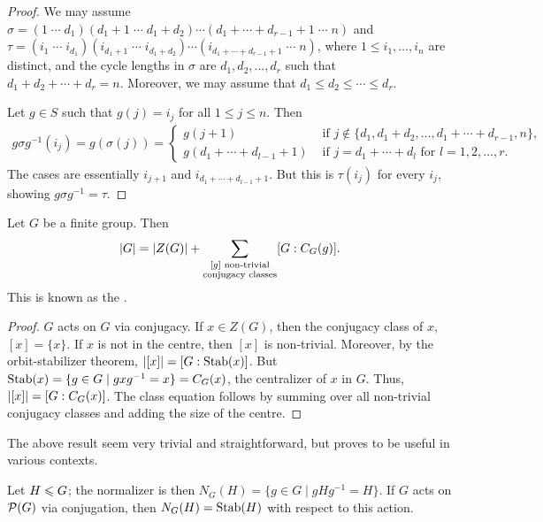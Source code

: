 \begin{proof}
    We may assume $\sigma = (1\;\cdots\;d_{1})(d_{1}+1\;\cdots\;d_{1}+d_{2})\cdots(d_{1}+\cdots+d_{r-1}+1\;\cdots\;n)$ and $\tau = (i_{1}\;\cdots\;i_{d_{1}})(i_{d_{1}+1}\;\cdots\;i_{d_{1}+d_{2}})\cdots(i_{d_{1}+\cdots+d_{r-1}+1}\;\cdots\;n)$, where $1 \leq i_{1},\ldots,i_{n}$ are distinct, and the cycle lengths in $\sigma$ are $d_{1},d_{2},\ldots,d_{r}$ such that $d_{1}+d_{2}+\cdots+d_{r} = n$. Moreover, we may assume that $d_{1} \leq d_{2} \leq \cdots \leq d_{r}$.

    Let $g \in S$ such that $g(j) = i_{j}$ for all $1 \leq j \leq n$. Then
    \begin{align}
        g\sigma g^{-1}(i_{j}) = g(\sigma(j)) = \begin{cases}
            g(j+1) &\text{ if } j \notin \{d_{1},d_{1}+d_{2},\ldots,d_{1}+\cdots+d_{r-1},n\},\\
            g(d_{1}+\cdots+d_{l-1}+1) &\text{ if } j = d_{1}+\cdots+d_{l} \text{ for } l = 1,2,\ldots,r.
        \end{cases}
    \end{align}
    The cases are essentially $i_{j+1}$ and $i_{d_{1}+\cdots+d_{l-1}+1}$. But this is $\tau(i_{j})$ for every $i_{j}$, showing $g\sigma g^{-1} = \tau$.
\end{proof}

Let $G$ be a finite group. Then
\begin{align}
    \left| G \right| = \left| Z(G) \right| + \sum_{\substack{[g] \text{ non-trivial}\\ \text{conjugacy classes}}} [G:C_{G}(g)].
\end{align}
This is known as the .

\begin{proof}
    $G$ acts on $G$ via conjugacy. If $x \in Z(G)$, then the conjugacy class of $x$, $[x] = \{x\}$. If $x$ is not in the centre, then $[x]$ is non-trivial. Moreover, by the orbit-stabilizer theorem, $\left| [x] \right| = [G:\operatorname{Stab}(x)]$. But $\operatorname{Stab}(x) = \{g \in G \mid gxg^{-1} = x\} = C_{G}(x)$, the centralizer of $x$ in $G$. Thus, $\left| [x] \right| = [G:C_{G}(x)]$. The class equation follows by summing over all non-trivial conjugacy classes and adding the size of the centre.
\end{proof}

The above result seem very trivial and straightforward, but proves to be useful in various contexts.

\begin{remark}
        \item Let $H \leqslant G$; the normalizer is then $N_{G}(H) = \{g \in G \mid gHg^{-1} = H\}$. If $G$ acts on $\mathcal{P}(G)$ via conjugation, then $N_{G}(H) = \operatorname{Stab}(H)$ with respect to this action.
\end{remark}

